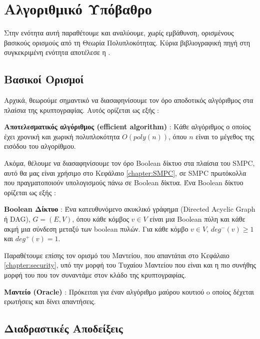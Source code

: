 \section{Αλγοριθμικό Υπόβαθρο}
\label{section:algorithmic-background}

Στην ενότητα αυτή παραθέτουμε και αναλύουμε, χωρίς εμβάθυνση, ορισμένους βασικούς ορισμούς από τη Θεωρία Πολυπλοκότητας. Κύρια βιβλιογραφική πηγή στη συγκεκριμένη ενότητα αποτέλεσε η \cite{Bauer2011}.

\subsection{Βασικοί Ορισμοί}

Αρχικά, θεωρούμε σημαντικό να διασαφηνίσουμε τον όρο αποδοτικός αλγόριθμος στα πλαίσια της κρυπτογραφίας. Αυτός ορίζεται ως εξής :

\begin{definition}
\textbf{Αποτελεσματικός αλγόριθμος (efficient algorithm)} : Κάθε αλγόριθμος ο οποίος έχει χρονική και χωρική πολυπλοκότητα $O(poly(n))$, όπου $n$ είναι το μέγεθος της εισόδου του αλγορίθμου.
\end{definition}

Ακόμα, θέλουμε να διασαφηνίσουμε τον όρο Boolean δίκτυο στα πλαίσια του SMPC, αυτό θα μας είναι χρήσιμο στο Κεφάλαιο \ref{chapter:SMPC}, σε SMPC πρωτόκολλα που πραγματοποιούν υπολογισμούς πάνω σε Boolean δίκτυα. Ένα Boolean δίκτυο ορίζεται ως εξής :

\begin{definition}
\textbf{Boolean Δίκτυο} : Ένα κατευθυνόμενο ακυκλικό γράφημα (Directed Acyclic Graph ή DAG), $G=(E, V)$, όπου κάθε κόμβος $v \in V$ είναι μια Boolean πύλη και κάθε ακμή μια σύνδεση μεταξύ των boolean πυλών. Για κάθε κόμβο $v \in V$, $deg^-(v) \ge 1$ και $deg^+(v) = 1$.
\end{definition}

Παραθέτουμε επίσης τον ορισμό του Μαντείου, που απαντάται στο Κεφάλαιο \ref{chapter:security}, υπό την μορφή του Τυχαίου Μαντείου που είναι και η πιο συνήθης μορφή του που τον συναντάμε στον κλάδο της κρυπτογραφίας.

\begin{definition}
\textbf{Μαντείο (Oracle)} : Πρόκειται για έναν αλγόριθμο μαύρου κουτιού o οποίος δέχεται ερωτήσεις και δίνει απαντήσεις.
\end{definition}

\subsection{Διαδραστικές Αποδείξεις}

